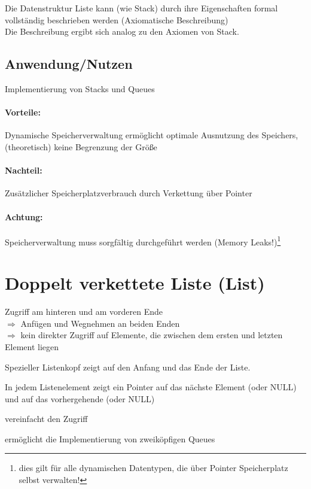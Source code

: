 Die Datenstruktur Liste kann (wie Stack) durch ihre Eigenschaften formal vollständig beschrieben werden (Axiomatische Beschreibung)\\
Die Beschreibung ergibt sich analog zu den Axiomen von Stack.

\subsection{Anwendung/Nutzen}
Implementierung von Stacks und Queues
\paragraph{Vorteile:} Dynamische Speicherverwaltung ermöglicht optimale Ausnutzung des Speichers, (theoretisch) keine Begrenzung der Größe

\paragraph{Nachteil:} Zusätzlicher Speicherplatzverbrauch durch Verkettung über Pointer

\paragraph{Achtung:} Speicherverwaltung muss sorgfältig durchgeführt werden (Memory Leaks!)\footnote{dies gilt für alle dynamischen Datentypen, die über Pointer Speicherplatz selbst verwalten!}

\section{Doppelt verkettete Liste (List)}
Zugriff {\flqq am hinteren\frqq} und am {\flqq vorderen Ende\frqq}\\
$\Rightarrow$ Anfügen und Wegnehmen an beiden Enden\\
$\Rightarrow$ kein direkter Zugriff auf Elemente, die zwischen dem ersten und letzten Element liegen

\begin{compactitem}
	\item Spezieller Listenkopf zeigt auf den Anfang und das Ende der Liste.
	\item In jedem Listenelement zeigt ein Pointer auf das nächste Element (oder NULL) und auf das vorhergehende (oder NULL)
	\item vereinfacht den Zugriff
	\item ermöglicht die Implementierung von zweiköpfigen Queues
\end{compactitem}

